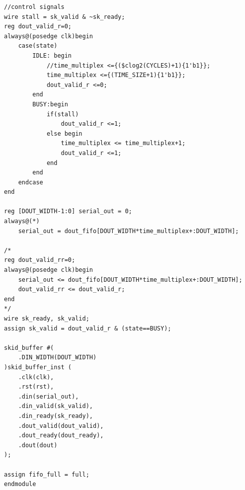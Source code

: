 \begin{lstlisting}[style={prettyverilog}, caption={Verilog code for PISO converter used in \texttt{hge\_write\_packetizer.v}.}, label={lst:verilog_sipo_converter}]
//control signals
wire stall = sk_valid & ~sk_ready;
reg dout_valid_r=0;
always@(posedge clk)begin
    case(state)
        IDLE: begin
            //time_multiplex <={($clog2(CYCLES)+1){1'b1}};
            time_multiplex <={(TIME_SIZE+1){1'b1}};
            dout_valid_r <=0;
        end
        BUSY:begin
            if(stall)
                dout_valid_r <=1;
            else begin 
                time_multiplex <= time_multiplex+1;
                dout_valid_r <=1;
            end
        end
    endcase
end

reg [DOUT_WIDTH-1:0] serial_out = 0;
always@(*)
    serial_out = dout_fifo[DOUT_WIDTH*time_multiplex+:DOUT_WIDTH];

/*
reg dout_valid_rr=0;
always@(posedge clk)begin
    serial_out <= dout_fifo[DOUT_WIDTH*time_multiplex+:DOUT_WIDTH];
    dout_valid_rr <= dout_valid_r;
end
*/
wire sk_ready, sk_valid;
assign sk_valid = dout_valid_r & (state==BUSY);

skid_buffer #(
    .DIN_WIDTH(DOUT_WIDTH)
)skid_buffer_inst (
    .clk(clk),
    .rst(rst),
    .din(serial_out),
    .din_valid(sk_valid), 
    .din_ready(sk_ready), 
    .dout_valid(dout_valid), 
    .dout_ready(dout_ready), 
    .dout(dout)
);

assign fifo_full = full;
endmodule
\end{lstlisting}

